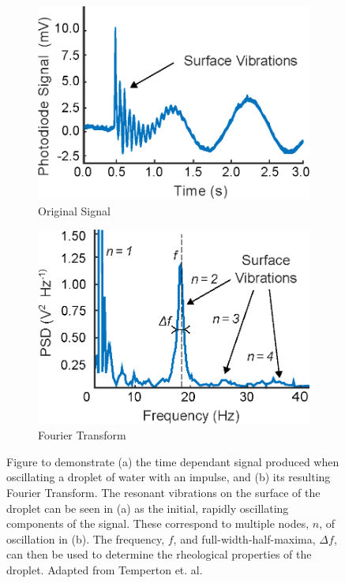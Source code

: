 \documentclass{physics_article_B}
\begin{document}
        \begin{figure}[H]
            \centering
                \begin{subfigure}[b]{0.48\textwidth}\hspace*{0cm}\includegraphics[width=\textwidth]{Figures/TempertonSignal.eps}
                    \caption{Original Signal}
                    \label{fig:temperton:signal}
                \end{subfigure}\hspace{3pt}
                \begin{subfigure}[b]{0.48\textwidth}\hspace*{0cm}\includegraphics[width=\textwidth]{Figures/TempertonSignalPD.eps}
                    \caption{Fourier Transform}
                    \label{fig:temperton:PD}
                \end{subfigure}
            \caption{Figure to demonstrate (a) the time dependant signal produced when oscillating a droplet of water with an impulse, and (b) its resulting Fourier Transform. The resonant vibrations on the surface of the droplet can be seen in (a) as the initial, rapidly oscillating components of the signal. These correspond to multiple nodes, $n$, of oscillation in (b). The frequency, $f$, and full-width-half-maxima, $\Delta f$, can then be used to determine the rheological properties of the droplet. Adapted from Temperton et. al.\cite{temperton}}\label{fig:temperton}
        \end{figure}
\end{document}

